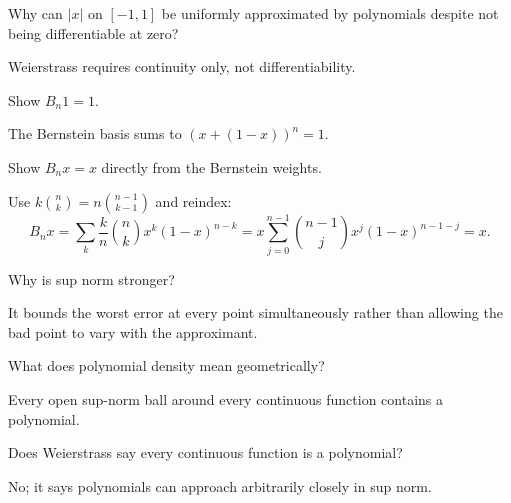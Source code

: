 \begin{problem}\label{prob:ii21-problem-01}
Why can $|x|$ on $[-1,1]$ be uniformly approximated by polynomials despite not being differentiable at zero?
\end{problem}
\begin{solution}
Weierstrass requires continuity only, not differentiability.
\end{solution}

\begin{problem}\label{prob:ii21-problem-02}
Show $B_n1=1$.
\end{problem}
\begin{solution}
The Bernstein basis sums to $(x+(1-x))^n=1$.
\end{solution}

\begin{problem}\label{prob:ii21-problem-03}
Show $B_nx=x$ directly from the Bernstein weights.
\end{problem}
\begin{solution}
Use $k\binom nk=n\binom{n-1}{k-1}$ and reindex:
\[
B_nx=\sum_k\frac{k}{n}\binom nkx^k(1-x)^{n-k}
=x\sum_{j=0}^{n-1}\binom{n-1}{j}x^j(1-x)^{n-1-j}=x.
\]
\end{solution}

\begin{problem}\label{prob:ii21-problem-04}
Why is sup norm stronger?
\end{problem}
\begin{solution}
It bounds the worst error at every point simultaneously rather than allowing the bad point to vary with the approximant.
\end{solution}

\begin{problem}\label{prob:ii21-problem-05}
What does polynomial density mean geometrically?
\end{problem}
\begin{solution}
Every open sup-norm ball around every continuous function contains a polynomial.
\end{solution}

\begin{problem}\label{prob:ii21-problem-06}
Does Weierstrass say every continuous function is a polynomial?
\end{problem}
\begin{solution}
No; it says polynomials can approach arbitrarily closely in sup norm.
\end{solution}

